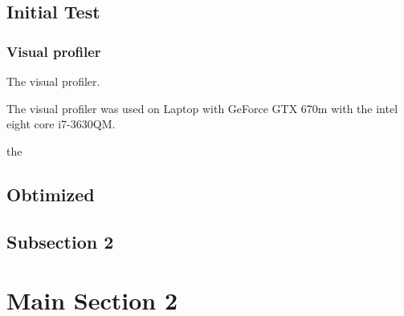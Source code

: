 \subsection{Initial Test}



\subsubsection{Visual profiler}

The visual profiler.

The visual profiler was used on Laptop with GeForce GTX 670m with the intel eight core  i7-3630QM.


the 


\subsection{Obtimized}



\subsection{Subsection 2}


\section{Main Section 2}
